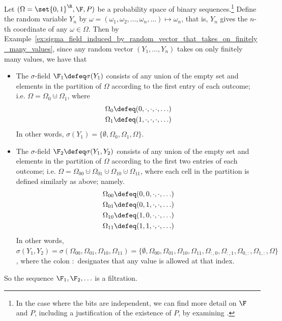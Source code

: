 \documentclass{article} %
\begin{document}
\begin{example}
Let $(\Omega = \set{0,1}^\R, \F, P)$ be a probability space of binary sequences.\footnote{In the case where the bits are independent, we can find more detail on $\F$ and $P$, including a justification of the existence of $P$, by examining \cite[Thm.~4.11.1]{ash2000probability}.  }  
Define the random variable $Y_n$ by $\omega = (\omega_1, \omega_2, \hdots, \omega_n, \hdots) \mapsto \omega_n$, that is, $Y_n$ gives the $n$-th coordinate of any $\omega \in \Omega$.   Then by Example~\ref{ex:sigma_field_induced_by_random_vector_that_takes_on_finitely_many_values}, since any random vector $(Y_1, \hdots, Y_n)$ takes on only finitely many values, we have that  


\begin{itemize}
	\item The $\sigma$-field $\F_1 \defeq \sigma(Y_1)$ consists of any union of the empty set and elements in the partition of $\Omega$ according to the first entry of each outcome; i.e. $\Omega = \Omega_0 \cupdot \Omega_1$, where
%
\begin{align*}
\Omega_0 &\defeq (0, \cdot, \cdot,\cdot, \hdots) \\
\Omega_1 &\defeq (1, \cdot, \cdot,\cdot, \hdots)
\end{align*}
%
In other words, $\sigma(Y_1) = \big\{ \emptyset, \Omega_0, \Omega_1, \Omega \big\}$.
%
\item The $\sigma$-field $\F_2 \defeq \sigma(Y_1, Y_2)$ consists of any union of the empty set and elements in the partition of $\Omega$ according to the first two entries of each outcome; i.e. $\Omega = \Omega_{00} \cupdot \Omega_{01} \cupdot \Omega_{10} \cupdot \Omega_{11}$, where each cell in the partition is defined similarly as above; namely.
%
\begin{align*}
\Omega_{00} &\defeq (0, 0, \cdot,\cdot, \hdots) \\
\Omega_{01} &\defeq (0, 1, \cdot,\cdot, \hdots) \\
\Omega_{10} &\defeq (1, 0, \cdot,\cdot, \hdots) \\
\Omega_{11} &\defeq (1, 1, \cdot,\cdot, \hdots)
\end{align*}
%
In other words, $\sigma(Y_1, Y_2) = \sigma(\Omega_{00}, \Omega_{01}, \Omega_{10}, \Omega_{11}) =  \big\{ \emptyset, \Omega_{00}, \Omega_{01}, \Omega_{10}, \Omega_{11}, \Omega_{:,0}, \Omega_{:,1},\Omega_{0, :}, \Omega_{1, :}, \Omega \big\}$, where the colon $:$ designates that any value is allowed at that index.
\end{itemize}
So the sequence $\F_1, \F_2, \hdots$ is a filtration.


\end{example}
\end{document}
